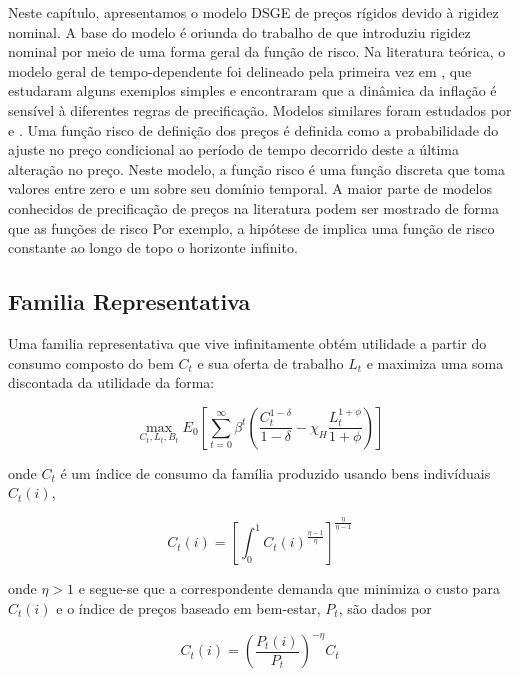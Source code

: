 \documentclass[twoside,a4paper,11pt]{report}
\begin{document}
Neste capítulo, apresentamos o modelo DSGE de preços rígidos devido à rigidez nominal. A base do modelo é oriunda do trabalho de \citet{yao2010aggregate} que introduziu rigidez nominal por meio de uma forma geral da função de risco. Na literatura teórica, o modelo geral de tempo-dependente foi delineado pela primeira vez em \citet{wolman1999sticky}, que estudaram alguns exemplos simples e encontraram que a dinâmica da inflação é sensível à diferentes regras de precificação. Modelos similares foram estudados por \citet{mash2004optimising} e \citet{yao2009cost}. Uma função risco de definição dos preços é definida como a probabilidade do ajuste no preço condicional ao período de tempo decorrido deste a última alteração no preço. Neste modelo, a função risco é uma função discreta que toma valores entre zero e um sobre seu domínio temporal. A maior parte de modelos conhecidos de precificação de preços na literatura podem ser mostrado de forma que as funções de risco Por exemplo, a hipótese de \citet{calvo1983staggered} implica uma função de risco constante ao longo de topo o horizonte infinito.

\subsection*{Familia Representativa}

Uma familia representativa que vive infinitamente obtém utilidade a partir do consumo composto do bem $C_{t}$ e sua oferta de trabalho $L_{t}$ e maximiza uma soma discontada da utilidade da forma:

\begin{equation}\label{eq01en02}
\max_{{{C}_{t},{L}_{t},{B}_{t}}}{{E}_{0}[\sum _{t=0}^{\infty}{{\beta}^{t}(\frac{{C}_{t}^{1-\delta}}{1-\delta}-{\chi}_{H}\frac{{L}_{t}^{1+\phi}}{1+\phi})}]} 
\end{equation}

\noindent onde $C_{t}$ é um índice de consumo da família produzido usando bens indivíduais $C_{t}(i)$, 

\begin{equation}\label{eq02en02}
{C}_{t}(i)={[\int _{0}^{1}{{C}_{t}{(i)}^{\frac{\eta -1}{\eta}}}]}^{\frac{\eta}{\eta -1}}
\end{equation}

\noindent onde $\eta>1$ e segue-se que a correspondente demanda que minimiza o custo para $C_{t}(i)$ e o índice de preços baseado em bem-estar, $P_{t}$, são dados por

\begin{equation}\label{eq03en02}
{C}_{t}(i)={(\frac{{P}_{t}(i)}{{P}_{t}})}^{-\eta}{C}_{t}
\end{equation}
\end{document}
